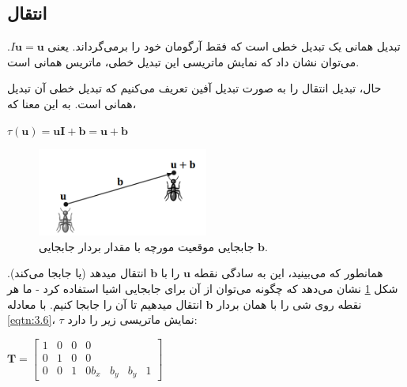 \subsection{\textbf{انتقال}}
\label{subsec:3.2.3}
{
    \Large
    \begin{spacing}{1.5}
        تبدیل همانی یک تبدیل خطی است که فقط آرگومان خود را برمی‌گرداند.
        یعنی $I\textbf{u}=\textbf{u}$.
        می‌توان نشان داد که نمایش ماتریسی این تبدیل خطی، ماتریس همانی است.

        حال، تبدیل انتقال را به صورت تبدیل آفین تعریف می‌کنیم که تبدیل خطی آن تبدیل همانی است. به این معنا که،

        \begin{center}
            $\tau(\textbf{u})=\textbf{uI}+\textbf{b}=\textbf{u}+\textbf{b}$
        \end{center}

        \begin{figure}[H]
            \centering
            \setlength{\belowcaptionskip}{-10pt}
            \includegraphics[width=0.5\textwidth]{Images/4/3/4.Session.1.3.5}
            \caption {جابجایی موقعیت مورچه با مقدار بردار جابجایی $\textbf{b}$.}
            \label{fig:4.Session.1.3.5}
        \end{figure}

        همانطور که می‌بینید، این به سادگی نقطه $\textbf{u}$ را با $\textbf{b}$ انتقال میدهد (یا جابجا می‌کند).
        شکل \ref{fig:4.Session.1.3.5} نشان می‌دهد که چگونه می‌توان از آن برای جابجایی اشیا استفاده کرد - ما هر نقطه روی شی را با همان بردار $\textbf{b}$ انتقال میدهیم تا آن را جابجا کنیم.
        با معادله \ref{eqtn:3.6}، $\tau$ نمایش ماتریسی زیر را دارد:

        \begin{center}
            $\textbf{T}=\begin{bmatrix}
                            1 & 0 & 0 & 0 \\
                            0 & 1 & 0 & 0 \\
                            0 & 0 & 1 & 0
                            b_{x} & b_{y} & b_{y} & 1
            \end{bmatrix}$
        \end{center}


\end{spacing}}
